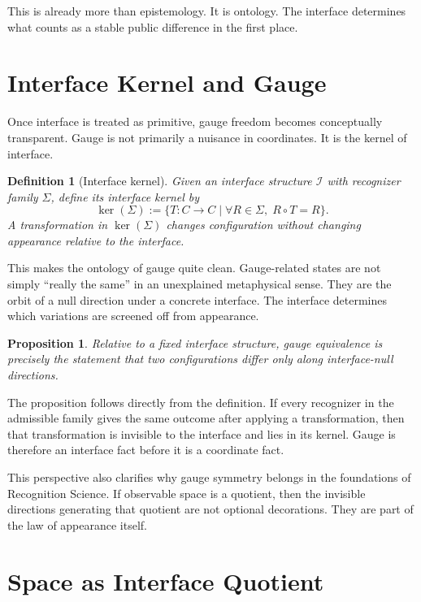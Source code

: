 \documentclass[11pt]{article}
\newtheorem{definition}{Definition}
\newtheorem{proposition}{Proposition}
\begin{document}
This is already more than epistemology.
It is ontology.
The interface determines what counts as a stable public difference in the first place.

\section{Interface Kernel and Gauge}

Once interface is treated as primitive, gauge freedom becomes conceptually transparent.
Gauge is not primarily a nuisance in coordinates.
It is the kernel of interface.

\begin{definition}[Interface kernel]
Given an interface structure $\mathcal{I}$ with recognizer family $\Sigma$, define its interface kernel by
\[
\ker(\Sigma) := \{T : C \to C \mid \forall R \in \Sigma,\; R\circ T = R\}.
\]
A transformation in $\ker(\Sigma)$ changes configuration without changing appearance relative to the interface.
\end{definition}

This makes the ontology of gauge quite clean.
Gauge-related states are not simply ``really the same'' in an unexplained metaphysical sense.
They are the orbit of a null direction under a concrete interface.
The interface determines which variations are screened off from appearance.

\begin{proposition}
Relative to a fixed interface structure, gauge equivalence is precisely the statement that two configurations differ only along interface-null directions.
\end{proposition}

\noindent
The proposition follows directly from the definition.
If every recognizer in the admissible family gives the same outcome after applying a transformation, then that transformation is invisible to the interface and lies in its kernel.
Gauge is therefore an interface fact before it is a coordinate fact.

This perspective also clarifies why gauge symmetry belongs in the foundations of Recognition Science.
If observable space is a quotient, then the invisible directions generating that quotient are not optional decorations.
They are part of the law of appearance itself.

\section{Space as Interface Quotient}
\end{document}
